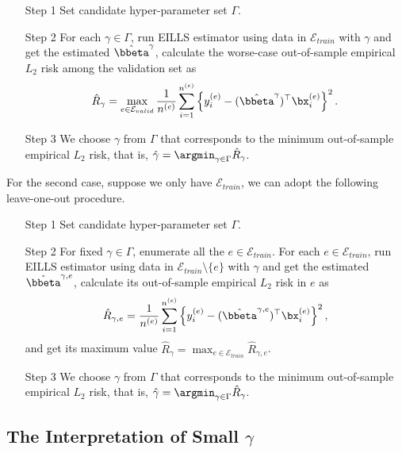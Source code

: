\documentclass[10pt]{article}
\numberwithin{equation}{section}
\begin{document}
    \begin{itemize} 
        \item[Step 1] Set candidate hyper-parameter set $\Gamma$.
        \item[Step 2] For each $\gamma \in \Gamma$, run EILLS estimator using data in $\mathcal{E}_{train}$ with $\gamma$ and get the estimated $\hat{\bbeta}^\gamma$, calculate the worse-case out-of-sample empirical $L_2$ risk among the validation set as
        \begin{align*}
            \hat{R}_\gamma = \max_{e\in \mathcal{E}_{valid}} \frac{1}{n^{(e)}} \sum_{i=1}^{n^{(e)}} \left\{y_i^{(e)} - (\hat{\bbeta}^\gamma)^\top \bx_i^{(e)} \right\}^2.
        \end{align*}
        \item[Step 3] We choose $\gamma$ from $\Gamma$ that corresponds to the minimum out-of-sample empirical $L_2$ risk, that is, $\hat{\gamma} = \argmin_{\gamma \in \Gamma} \hat{R}_\gamma$.
    \end{itemize}

    For the second case, suppose we only have $\mathcal{E}_{train}$, we can adopt the following leave-one-out procedure. 

    \begin{itemize} 
        \item[Step 1] Set candidate hyper-parameter set $\Gamma$.
        \item[Step 2] For fixed $\gamma \in \Gamma$, enumerate all the $e\in \mathcal{E}_{train}$. For each $e \in \mathcal{E}_{train}$, run EILLS estimator using data in $\mathcal{E}_{train} \setminus \{e\}$ with $\gamma$ and get the estimated $\hat{\bbeta}^{\gamma, e}$, calculate its out-of-sample empirical $L_2$ risk in $e$ as
        \begin{align*}
            \hat{R}_{\gamma, e} = \frac{1}{n^{(e)}} \sum_{i=1}^{n^{(e)}} \left\{y_i^{(e)} - (\hat{\bbeta}^{\gamma,e})^\top \bx_i^{(e)} \right\}^2,
        \end{align*} and get its maximum value $\hat{R}_{\gamma} = \max_{e\in \mathcal{E}_{train}} \hat{R}_{\gamma, e}$. 
        \item[Step 3] We choose $\gamma$ from $\Gamma$ that corresponds to the minimum out-of-sample empirical $L_2$ risk, that is, $\hat{\gamma} = \argmin_{\gamma \in \Gamma} \hat{R}_\gamma$.
    \end{itemize}


\subsection{The Interpretation of Small $\gamma$}
\label{sec:small-gamma}
\end{document}
